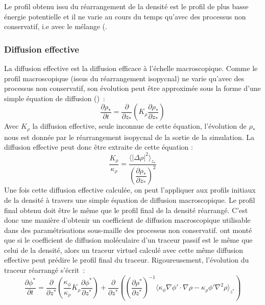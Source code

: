 \documentclass[a4paper,12pt]{article}
\begin{document}
        Le profil obtenu issu du réarrangement de la densité est le profil de plus basse énergie potentielle et il ne varie au cours du temps qu'avec des processus non conservatif, i.e avec le mélange (\cite*{winters_diascalar_1996}.
        
        \subsubsection{Diffusion effective}
        
        La diffusion effective est la diffusion efficace à l'échelle macroscopique. Comme le profil macroscopique (issus du réarrangement isopycnal) ne varie qu'avec des processus non conservatif, son évolution peut être approximée sous la forme d'une simple équation de diffusion (\citep{penney_diapycnal_2020-1}) : 
        \begin{equation}
            \label{rho*}
            \frac{\partial\rho_*}{\partial t}=\frac{\partial}{\partial z_*}(K_{\rho}\frac{\partial\rho_*}{\partial z_*})
        \end{equation}
        Avec $K_{\rho}$ la diffusion effective, seule inconnue de cette équation, l'évolution de $\rho_*$ nous est donnée par le réarrangement isopycnal de la sortie de la simulation. La diffusion effective peut donc être extraite de cette équation :
        \begin{equation}
            \label{Keff}
            \frac{K_{\rho}}{\kappa_{\rho}}=\frac{\langle\vert\Delta\rho\vert^2\rangle_{z_*}}{(\dfrac{\partial\rho_*}{\partial z_*})^2}
        \end{equation}
        Une fois cette diffusion effective calculée, on peut l'appliquer aux profils initiaux de la densité à travers une simple équation de diffusion macroscopique. Le profil final obtenu doit être le même que le profil final de la densité réarrangé. C'est donc une manière d'obtenir un coefficient de diffusion macroscopique utilisable dans des paramétrisations sous-maille des processus non conservatif. \cite{penney_diapycnal_2020} ont monté que si le coefficient de diffusion moléculaire d'un traceur passif est le même que celui de la densité, alors un traceur virtuel calculé avec cette même diffusion effective peut prédire le profil final du traceur. Rigoureusement, l'évolution du traceur réarrangé s'écrit : 
        \begin{equation}
           \frac{\partial\phi^*}{\partial t} = \frac{\partial}{\partial z^*} (\frac{\kappa_{\phi}}{\kappa_{\rho}}K_{\rho}\frac{\partial\phi^*}{\partial z^*}) + \frac{\partial}{\partial z^*} ((\frac{\partial\rho^*}{\partial z^*})^{-1} \langle\kappa_{\phi}\nabla\phi'\cdot \nabla\rho - \kappa_{\rho}\phi'\nabla^2\rho\rangle_{z^*})
           \label{phi*}
        \end{equation}
\end{document}
